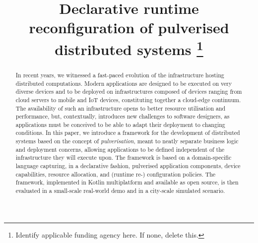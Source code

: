 \documentclass[conference]{IEEEtran}
\begin{document}
\title{Declarative runtime reconfiguration of pulverised distributed systems
\thanks{Identify applicable funding agency here. If none, delete this.}
}

\author{
\and
{}
\and
{}
\and
{}
}

\maketitle

\begin{abstract}
In recent years, we witnessed a fast-paced evolution of the infrastructure hosting distributed computations.
%
Modern applications are designed to be executed on very diverse devices
and to be deployed on infrastructures composed of devices ranging from cloud servers to mobile and IoT devices,
constituting together a cloud-edge continuum.
%
The availability of such an infrastructure opens to better resource utilisation and performance,
but, contextually, introduces new challenges to software designers,
as applications must be conceived to be able to adapt their deployment to changing conditions.
%
In this paper,
we introduce a framework for the development of distributed systems
based on the concept of \emph{pulverisation},
meant to neatly separate business logic and deployment concerns,
allowing applications to be defined independent of the infrastructure they will execute upon.
%
The framework is based on a domain-specific language capturing,
in a declarative fashion,
pulverised application components, device capabilities, resource allocation, and (runtime re-) configuration policies.
%
The framework, implemented in Kotlin multiplatform and available as open source,
is then evaluated in a small-scale real-world demo and in a city-scale simulated scenario.
\end{abstract}
\end{document}
